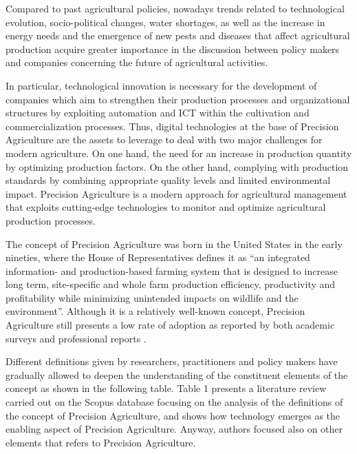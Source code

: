 \documentclass[]{book}
\begin{document}
Compared to past agricultural policies, nowadays trends related to
technological evolution, socio-political changes, water shortages, as
well as the increase in energy needs and the emergence of new pests and
diseases that affect agricultural production acquire greater importance
in the discussion between policy makers and companies concerning the
future of agricultural activities.

In particular, technological innovation is necessary for the development
of companies which aim to strengthen their production processes and
organizational structures by exploiting automation and ICT within the
cultivation and commercialization processes. Thus, digital technologies
at the base of Precision Agriculture are the assets to leverage to deal
with two major challenges for modern agriculture. On one hand, the need
for an increase in production quantity by optimizing production factors.
On the other hand, complying with production standards by combining
appropriate quality levels and limited environmental impact. Precision
Agriculture is a modern approach for agricultural management that
exploits cutting-edge technologies to monitor and optimize agricultural
production processes.

The concept of Precision Agriculture was born in the United States in
the early nineties, where the House of Representatives
\citep{liaghat2010review} defines it as ``an integrated information- and
production-based farming system that is designed to increase long term,
site-specific and whole farm production efficiency, productivity and
profitability while minimizing unintended impacts on wildlife and the
environment''. Although it is a relatively well-known concept, Precision
Agriculture still presents a low rate of adoption as reported by both
academic surveys and professional reports \citep{pierpaoli2013drivers}.

Different definitions given by researchers, practitioners and policy
makers have gradually allowed to deepen the understanding of the
constituent elements of the concept as shown in the following table.
Table 1 presents a literature review carried out on the Scopus database
focusing on the analysis of the definitions of the concept of Precision
Agriculture, and shows how technology emerges as the enabling aspect of
Precision Agriculture. Anyway, authors focused also on other elements
that refers to Precision Agriculture.
\end{document}

